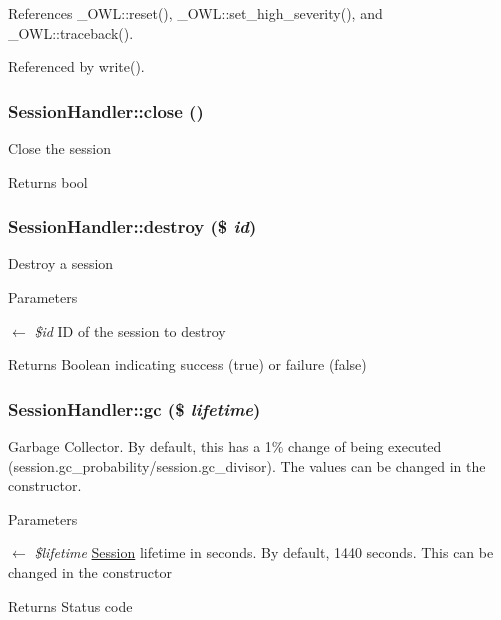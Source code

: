 References \_\-OWL::reset(), \_\-OWL::set\_\-high\_\-severity(), and \_\-OWL::traceback().



Referenced by write().

\subsubsection[{close}]{\setlength{\rightskip}{0pt plus 5cm}SessionHandler::close ()}\label{classSessionHandler_a335ced83731c7e3e685b7e0df2989c79}
Close the session

\begin{DoxyReturn}{Returns}
bool 
\end{DoxyReturn}
\subsubsection[{destroy}]{\setlength{\rightskip}{0pt plus 5cm}SessionHandler::destroy (\$ {\em id})}\label{classSessionHandler_a4e43712ef307979de1b12039ef801adb}
Destroy a session


\begin{DoxyParams}{Parameters}
\item[\mbox{$\leftarrow$} {\em \$id}]ID of the session to destroy \end{DoxyParams}
\begin{DoxyReturn}{Returns}
Boolean indicating success (true) or failure (false) 
\end{DoxyReturn}
\subsubsection[{gc}]{\setlength{\rightskip}{0pt plus 5cm}SessionHandler::gc (\$ {\em lifetime})}\label{classSessionHandler_ac33097332375ae3f8a43c31cef6db0e8}
Garbage Collector. By default, this has a 1\% change of being executed (session.gc\_\-probability/session.gc\_\-divisor). The values can be changed in the constructor.


\begin{DoxyParams}{Parameters}
\item[\mbox{$\leftarrow$} {\em \$lifetime}]\hyperlink{classSession}{Session} lifetime in seconds. By default, 1440 seconds. This can be changed in the constructor \end{DoxyParams}
\begin{DoxyReturn}{Returns}
Status code 
\end{DoxyReturn}
